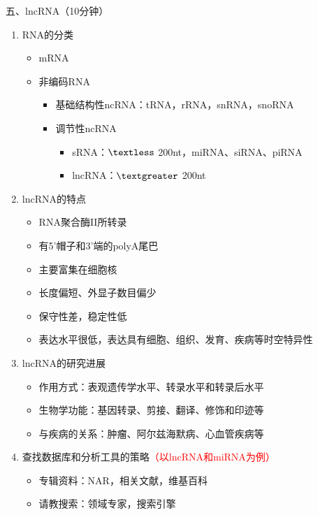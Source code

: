 \documentclass{TIJMUjiaoanLL}
\begin{document}
\noindent
五、lncRNA（10分钟）
\begin{enumerate}
  \item RNA的分类
    \begin{itemize}
      \item mRNA
      \item 非编码RNA
	\begin{itemize}
	  \item 基础结构性ncRNA：tRNA，rRNA，snRNA，snoRNA
	  \item 调节性ncRNA
	    \begin{itemize}
	      \item sRNA：$\textless$ 200nt，miRNA、siRNA、piRNA
	      \item lncRNA：$\textgreater$ 200nt
	    \end{itemize}
	\end{itemize}
    \end{itemize}
  \item lncRNA的特点
    \begin{itemize}
      \item RNA聚合酶II所转录
      \item 有5'帽子和3'端的polyA尾巴
      \item 主要富集在细胞核
      \item 长度偏短、外显子数目偏少
      \item 保守性差，稳定性低
      \item 表达水平很低，表达具有细胞、组织、发育、疾病等时空特异性
    \end{itemize}
  \item lncRNA的研究进展
    \begin{itemize}
      \item 作用方式：表观遗传学水平、转录水平和转录后水平
      \item 生物学功能：基因转录、剪接、翻译、修饰和印迹等
      \item 与疾病的关系：肿瘤、阿尔兹海默病、心血管疾病等
    \end{itemize}
  \item 查找数据库和分析工具的策略\textcolor{red}{（以lncRNA和miRNA为例）}
    \begin{itemize}
      \item 专辑资料：NAR，相关文献，维基百科
      \item 请教搜索：领域专家，搜索引擎
    \end{itemize}
\end{enumerate}

\otherTail
\newpage
\otherHeader
\end{document}
